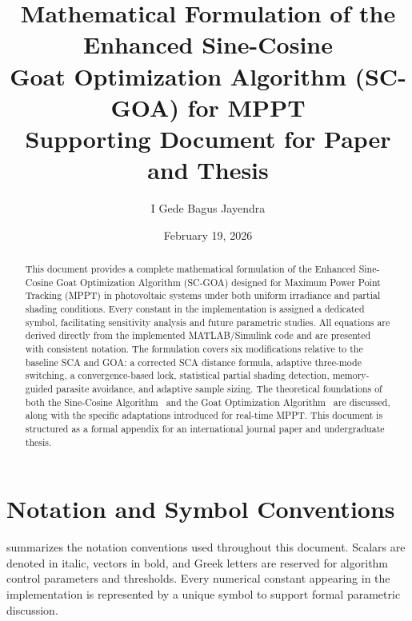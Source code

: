 \documentclass[a4paper, 12pt]{article}
\title{%
    \textbf{Mathematical Formulation of the Enhanced Sine-Cosine \\
    Goat Optimization Algorithm (SC-GOA) for MPPT} \\[6pt]
    \large Supporting Document for Paper and Thesis
}
\author{I Gede Bagus Jayendra}
\date{February 19, 2026}
\begin{document}
\maketitle

\begin{abstract}
This document provides a complete mathematical formulation of the Enhanced Sine-Cosine Goat Optimization Algorithm (SC-GOA) designed for Maximum Power Point Tracking (MPPT) in photovoltaic systems under both uniform irradiance and partial shading conditions. Every constant in the implementation is assigned a dedicated symbol, facilitating sensitivity analysis and future parametric studies. All equations are derived directly from the implemented MATLAB/Simulink code and are presented with consistent notation. The formulation covers six modifications relative to the baseline SCA and GOA: a corrected SCA distance formula, adaptive three-mode switching, a convergence-based lock, statistical partial shading detection, memory-guided parasite avoidance, and adaptive sample sizing. The theoretical foundations of both the Sine-Cosine Algorithm~\cite{mirjalili2016sca} and the Goat Optimization Algorithm~\cite{nozari2025goa} are discussed, along with the specific adaptations introduced for real-time MPPT. This document is structured as a formal appendix for an international journal paper and undergraduate thesis.
\end{abstract}

\tableofcontents
\newpage

\section{Notation and Symbol Conventions}
\label{sec:notation}

 summarizes the notation conventions used throughout this document. Scalars are denoted in italic, vectors in bold, and Greek letters are reserved for algorithm control parameters and thresholds. Every numerical constant appearing in the implementation is represented by a unique symbol to support formal parametric discussion.
\end{document}
